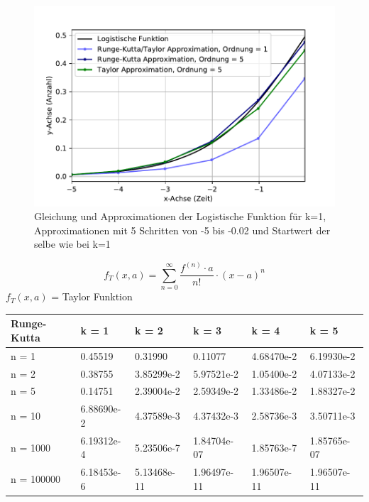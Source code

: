 \begin{figure}[h]
	\begin{center}
	\includegraphics[width=12cm]{papers/taylor/taylorPictures/LogisticFunction.pdf}
	\caption{Gleichung und Approximationen der Logistische Funktion für k=1, Approximationen mit 5 Schritten von -5 bis -0.02 und Startwert der selbe wie bei k=1}
	\label{taylor:section:fig:LogisticFunctionApproximation}
	\end{center}
\end{figure}

\begin{equation}
	f_{T}(x,a)
	=
	\sum_{n=0}^{\infty}{\frac{f^{(n)}\cdot a}{n!}}\cdot (x-a)^{n}
	\label{taylor:section:taylor}
\end{equation}
$f_{T}(x,a)$ = Taylor Funktion


\begin{tabular}[h]{|l|l|l|l|l|l|}
	\hline
	Runge-Kutta & k = 1 & k = 2 & k = 3 & k = 4 & k = 5\\
	\hline
	n = 1 & 0.45519 & 0.31990 & 0.11077 & 4.68470e-2 & 6.19930e-2\\
	\hline
	n = 2 & 0.38755 & 3.85299e-2 & 5.97521e-2 & 1.05400e-2 & 4.07133e-2\\
	\hline
	n = 5 & 0.14751 & 2.39004e-2 & 2.59349e-2 & 1.33486e-2 & 1.88327e-2\\
	\hline
	n = 10 & 6.88690e-2 & 4.37589e-3 & 4.37432e-3 & 2.58736e-3 & 3.50711e-3\\
	\hline
	n = 1000 & 6.19312e-4 & 5.23506e-7 & 1.84704e-07 & 1.85763e-7 & 1.85765e-07\\
	\hline
	n = 100000 & 6.18453e-6 & 5.13468e-11 & 1.96497e-11 & 1.96507e-11 & 1.96507e-11\\
	\hline
\end{tabular}

